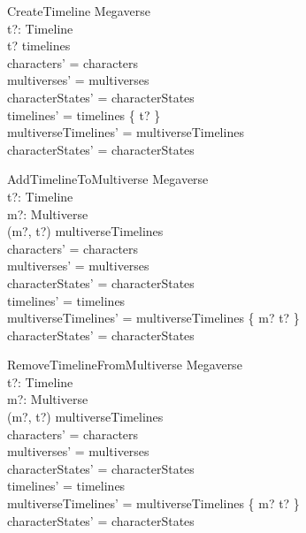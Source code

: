 \documentclass{article}
\begin{document}
\begin{schema}{CreateTimeline}
\Delta Megaverse \\
t?: Timeline \\
\where
t? \notin timelines \\ 
characters' = characters \\ 
multiverses' = multiverses \\
characterStates' = characterStates \\ 
timelines' = timelines \cup \{ t? \} \\
multiverseTimelines' = multiverseTimelines \\
characterStates' = characterStates \\
\end{schema}

\begin{schema}{AddTimelineToMultiverse}
\Delta Megaverse \\
t?: Timeline \\
m?: Multiverse \\
\where
(m?, t?) \notin multiverseTimelines \\ 
characters' = characters \\ 
multiverses' = multiverses \\
characterStates' = characterStates \\ 
timelines' = timelines \\
multiverseTimelines' = multiverseTimelines \cup \{ m? \mapsto t? \} \\
characterStates' = characterStates \\
\end{schema}

\begin{schema}{RemoveTimelineFromMultiverse}
\Delta Megaverse \\
t?: Timeline \\
m?: Multiverse \\
\where
(m?, t?) \in multiverseTimelines \\ 
characters' = characters \\ 
multiverses' = multiverses \\
characterStates' = characterStates \\ 
timelines' = timelines \\
multiverseTimelines' = multiverseTimelines \setminus \{ m? \mapsto t? \} \\
characterStates' = characterStates \\
\end{schema}
\end{document}
